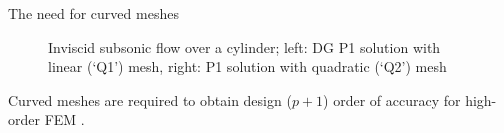 \documentclass[t,12pt]{beamer}
\begin{document}
\begin{frame}{The need for curved meshes}
 \begin{figure}
 	\centering
 	\caption{Inviscid subsonic flow over a cylinder; left: DG P1 solution with linear (`Q1') mesh, right: P1 solution with quadratic (`Q2') mesh \cite{appl:dgeuler}}
 	\label{fig:bassi}
 \end{figure}
Curved meshes are required to obtain design ($p+1$) order of accuracy for high-order FEM \cite{curve:geomacc}.
\end{frame}
\end{document}
